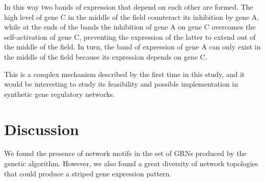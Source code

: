 \documentclass[10pt,letterpaper]{article}
\begin{document}
In this way two bands of expression that depend on each other are formed. The
high level of gene C in the middle of the field counteract its inhibition by
gene A, while at the ends of the bands the inhibition of gene A on gene C
overcomes the self-activation of gene C, preventing the expression of the
latter to extend out of the middle of the field. In turn, the band of
expression of gene A can only exist in the middle of the field because its
expression depends on gene C.

This is a complex mechanism described by the first time in this study, and it
would be interesting to study its feasibility and possible implementation in
synthetic gene regulatory networks.

% 
% 
% 
% 
% 

\section*{Discussion}

We found the presence of network motifs in the set of GRNs produced by the
genetic algorithm. However, we also found a great diversity of network 
topologies that could produce a striped gene expression pattern.\\
\end{document}
